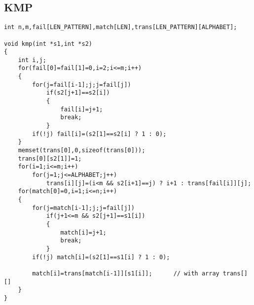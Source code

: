 \documentclass[a4paper,12pt]{article}
\begin{document}
\subsection{KMP}
\begin{lstlisting}
int n,m,fail[LEN_PATTERN],match[LEN],trans[LEN_PATTERN][ALPHABET];

void kmp(int *s1,int *s2)
{
    int i,j;
    for(fail[0]=fail[1]=0,i=2;i<=m;i++)
    {
        for(j=fail[i-1];j;j=fail[j])
            if(s2[j+1]==s2[i])
            {
                fail[i]=j+1;
                break;
            }
        if(!j) fail[i]=(s2[1]==s2[i] ? 1 : 0);
    }
    memset(trans[0],0,sizeof(trans[0]));
    trans[0][s2[1]]=1;
    for(i=1;i<=m;i++)
        for(j=1;j<=ALPHABET;j++)
            trans[i][j]=(i<m && s2[i+1]==j) ? i+1 : trans[fail[i]][j];
    for(match[0]=0,i=1;i<=n;i++)
    {
        for(j=match[i-1];j;j=fail[j])
            if(j+1<=m && s2[j+1]==s1[i])
            {
                match[i]=j+1;
                break;
            }
        if(!j) match[i]=(s2[1]==s1[i] ? 1 : 0);

        match[i]=trans[match[i-1]][s1[i]];      // with array trans[][]
    }
}
\end{lstlisting}
\end{document}

